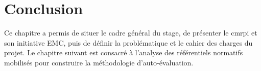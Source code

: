 \section*{Conclusion}

Ce chapitre a permis de situer le cadre général du stage, de présenter le \gls{cmrpi} et son initiative EMC, puis de définir la problématique et le cahier des charges du projet. Le chapitre suivant est consacré à l'analyse des référentiels normatifs mobilisés pour construire la méthodologie d'auto-évaluation.
